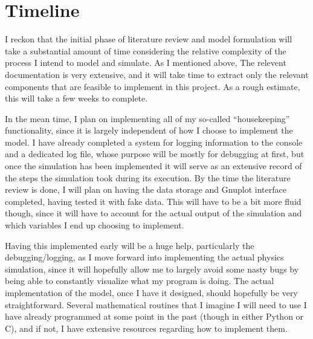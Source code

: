 \section{Timeline}\label{sec:Timeline}

I reckon that the initial phase of literature review and model formulation will take a substantial amount of time considering the relative complexity of the process I intend to model and simulate. As I mentioned above, The relevent documentation is very extensive, and it will take time to extract only the relevant components that are feasible to implement in this project. As a rough estimate, this will take a few weeks to complete.

In the mean time, I plan on implementing all of my so-called ``housekeeping'' functionality, since it is largely independent of how I choose to implement the model. I have already completed a system for logging information to the console and a dedicated log file, whose purpose will be mostly for debugging at first, but once the simulation has been implemented it will serve as an extensive record of the steps the simulation took during its execution. By the time the literature review is done, I will plan on having the data storage and Gnuplot interface completed, having tested it with fake data. This will have to be a bit more fluid though, since it will have to account for the actual output of the simulation and which variables I end up choosing to implement.

Having this implemented early will be a huge help, particularly the debugging/logging, as I move forward into implementing the actual physics simulation, since it will hopefully allow me to largely avoid some nasty bugs by being able to constantly visualize what my program is doing. The actual implementation of the model, once I have it designed, should hopefully be very straightforward. Several mathematical routines that I imagine I will need to use I have already programmed at some point in the past (though in either Python or C), and if not, I have extensive resources regarding how to implement them.


